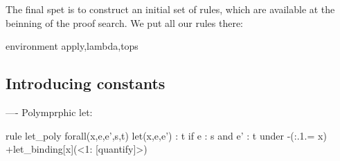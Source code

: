 The final spet is to construct an initial set of rules, which are available at the beinning of the proof search.  We put all our rules there:
\begin{code}
environment apply,lambda,tops
\end{code}

\subsection{Introducing constants}



----
Polymprphic let:

  rule let_poly
  forall(x,e,e’,s,t)
    let(x,e,e’) : t
  if e : s
  and e’ : t
  under -(:.1.= x) +let_binding[x](<1: [quantify]>)
